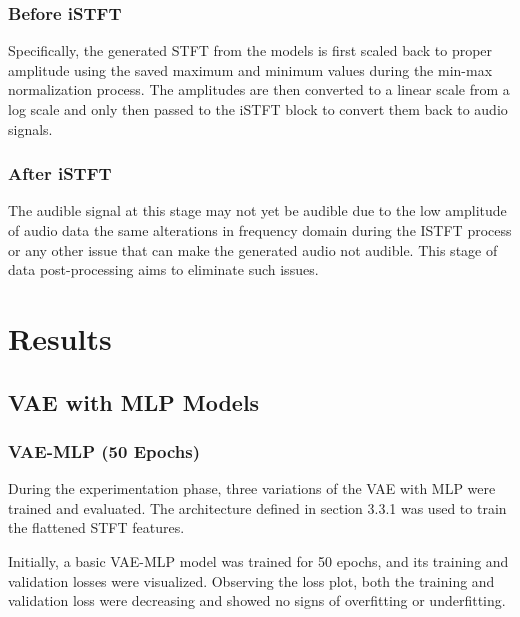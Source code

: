 \documentclass[12pt]{article}
\begin{document}
\subsubsection{Before iSTFT}
Specifically, the generated STFT from the models is first scaled back to proper amplitude using the saved maximum and minimum values during the min-max normalization process. The amplitudes are then converted to a linear scale from a log scale and only then passed to the iSTFT block to convert them back to audio signals.

\subsubsection{After iSTFT}
The audible signal at this stage may not yet be audible due to the low amplitude of audio data the same alterations in frequency domain during the ISTFT process or any other issue that can make the generated audio not audible. This stage of data post-processing aims to eliminate such issues.

\section{Results}
% 


\subsection{VAE with MLP Models}

\subsubsection{VAE-MLP (50 Epochs)}
During the experimentation phase, three variations of the VAE with MLP were trained and evaluated. The architecture defined in section 3.3.1 was used to train the flattened STFT features.

Initially, a basic VAE-MLP model was trained for 50 epochs, and its training and validation losses were visualized. Observing the loss plot, both the training and validation loss were decreasing and showed no signs of overfitting or underfitting.
\end{document}
